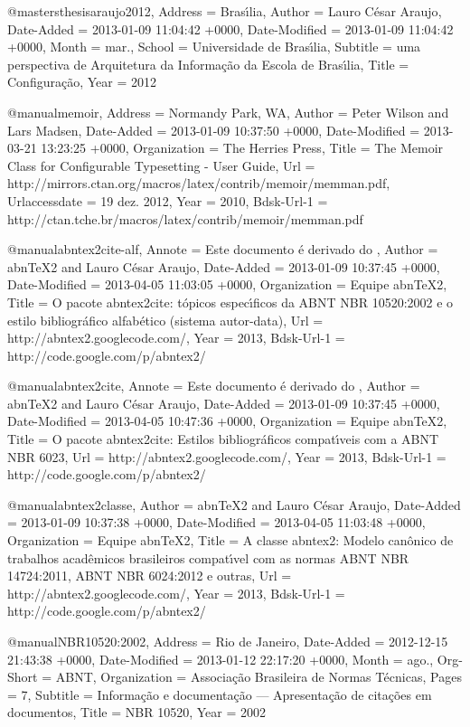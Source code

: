 @mastersthesis{araujo2012,
	Address = {Bras{\'\i}lia},
	Author = {Lauro C{\'e}sar Araujo},
	Date-Added = {2013-01-09 11:04:42 +0000},
	Date-Modified = {2013-01-09 11:04:42 +0000},
	Month = {mar.},
	School = {Universidade de Bras{\'\i}lia},
	Subtitle = {uma perspectiva de {A}rquitetura da {I}nforma{\c c}{\~a}o da {E}scola de {B}ras{\'\i}lia},
	Title = {Configura{\c c}{\~a}o},
	Year = {2012}}

@manual{memoir,
	Address = {Normandy Park, WA},
	Author = {Peter Wilson and Lars Madsen},
	Date-Added = {2013-01-09 10:37:50 +0000},
	Date-Modified = {2013-03-21 13:23:25 +0000},
	Organization = {The Herries Press},
	Title = {The Memoir Class for Configurable Typesetting - User Guide},
	Url = {http://mirrors.ctan.org/macros/latex/contrib/memoir/memman.pdf},
	Urlaccessdate = {19 dez. 2012},
	Year = {2010},
	Bdsk-Url-1 = {http://ctan.tche.br/macros/latex/contrib/memoir/memman.pdf}}

@manual{abntex2cite-alf,
	Annote = {Este documento {\'e} derivado do \cite{abnt-bibtex-alf-doc}},
	Author = {abnTeX2 and Lauro C{\'e}sar Araujo},
	Date-Added = {2013-01-09 10:37:45 +0000},
	Date-Modified = {2013-04-05 11:03:05 +0000},
	Organization = {Equipe abnTeX2},
	Title = {O pacote abntex2cite: t{\'o}picos espec{\'\i}ficos da ABNT NBR 10520:2002 e o estilo bibliogr{\'a}fico alfab{\'e}tico (sistema autor-data)},
	Url = {http://abntex2.googlecode.com/},
	Year = {2013},
	Bdsk-Url-1 = {http://code.google.com/p/abntex2/}}

@manual{abntex2cite,
	Annote = {Este documento {\'e} derivado do \cite{abnt-bibtex-doc}},
	Author = {abnTeX2 and Lauro C{\'e}sar Araujo},
	Date-Added = {2013-01-09 10:37:45 +0000},
	Date-Modified = {2013-04-05 10:47:36 +0000},
	Organization = {Equipe abnTeX2},
	Title = {O pacote abntex2cite: Estilos bibliogr{\'a}ficos compat{\'\i}veis com a ABNT NBR 6023},
	Url = {http://abntex2.googlecode.com/},
	Year = {2013},
	Bdsk-Url-1 = {http://code.google.com/p/abntex2/}}

@manual{abntex2classe,
	Author = {abnTeX2 and Lauro C{\'e}sar Araujo},
	Date-Added = {2013-01-09 10:37:38 +0000},
	Date-Modified = {2013-04-05 11:03:48 +0000},
	Organization = {Equipe abnTeX2},
	Title = {A classe abntex2: Modelo can{\^o}nico de trabalhos acad{\^e}micos brasileiros compat{\'\i}vel com as normas ABNT NBR 14724:2011, ABNT NBR 6024:2012 e outras},
	Url = {http://abntex2.googlecode.com/},
	Year = {2013},
	Bdsk-Url-1 = {http://code.google.com/p/abntex2/}}

@manual{NBR10520:2002,
	Address = {Rio de Janeiro},
	Date-Added = {2012-12-15 21:43:38 +0000},
	Date-Modified = {2013-01-12 22:17:20 +0000},
	Month = {ago.},
	Org-Short = {ABNT},
	Organization = {Associa{\c c}\~ao Brasileira de Normas T\'ecnicas},
	Pages = 7,
	Subtitle = {Informa{\c c}\~ao e documenta{\c c}\~ao --- Apresenta{\c c}\~ao de cita{\c c}\~oes em documentos},
	Title = {{NBR} 10520},
	Year = 2002}

